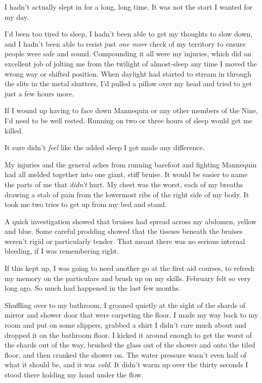 





I hadn't actually slept in for a long, long time.  It was not the start I wanted for my day.



I'd been too tired to sleep, I hadn't been able to get my thoughts to slow down, and I hadn't been able to resist just\emph{ one more} check of my territory to ensure people were safe and sound.  Compounding it all were my injuries, which did an excellent job of jolting me from the twilight of almost-sleep any time I moved the wrong way or shifted position.  When daylight had started to stream in through the slits in the metal shutters, I'd pulled a pillow over my head and tried to get just a few hours more.



If I wound up having to face down Mannequin or any other members of the Nine, I'd need to be well rested.  Running on two or three hours of sleep would get me killed.



It sure didn't \emph{feel} like the added sleep I got made any difference.



My injuries and the general aches from running barefoot and fighting Mannequin had all melded together into one giant, stiff bruise.  It would be easier to name the parts of me that \emph{didn't} hurt.  My chest was the worst, each of my breaths drawing a stab of pain from the lowermost ribs of the right side of my body.  It took me two tries to get up from my bed and stand.



A quick investigation showed that bruises had spread across my abdomen, yellow and blue.  Some careful prodding showed that the tissues beneath the bruises weren't rigid or particularly tender.  That meant there was no serious internal bleeding, if I was remembering right.



If this kept up, I was going to need another go at the first aid courses, to refresh my memory on the particulars and brush up on my skills.  February felt so very long ago.  So much had happened in the last few months.



Shuffling over to my bathroom, I groaned quietly at the sight of the shards of mirror and shower door that were carpeting the floor.  I made my way back to my room and put on some slippers, grabbed a shirt I didn't care much about and dropped it on the bathroom floor.  I kicked it around enough to get the worst of the shards out of the way, brushed the glass out of the shower and onto the tiled floor, and then cranked the shower on.  The water pressure wasn't even half of what it should be, and it was \emph{cold}.  It didn't warm up over the thirty seconds I stood there holding my hand under the flow.



